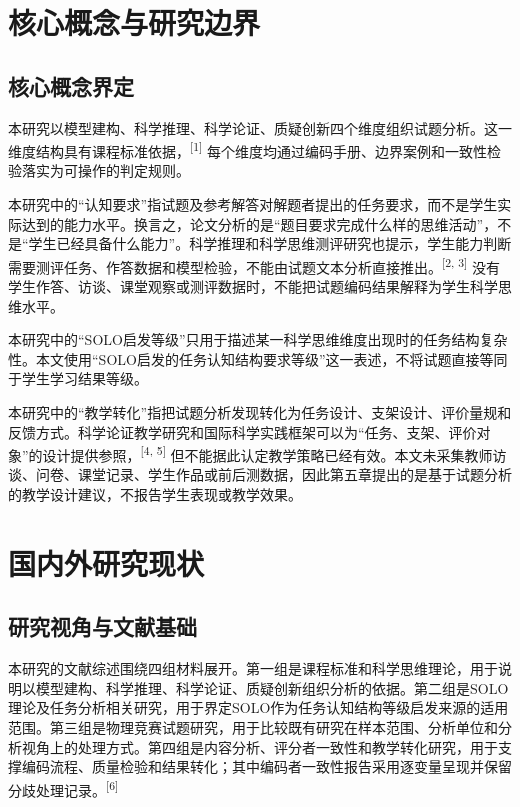 \documentclass[
  12pt,
  a4paper]{ctexbook}
\begin{document}
\section{核心概念与研究边界}\label{ux6838ux5fc3ux6982ux5ff5ux4e0eux7814ux7a76ux8fb9ux754c}

\subsection{核心概念界定}\label{ux6838ux5fc3ux6982ux5ff5ux754cux5b9a}

本研究以模型建构、科学推理、科学论证、质疑创新四个维度组织试题分析。这一维度结构具有课程标准依据，\textsuperscript{[1]}
每个维度均通过编码手册、边界案例和一致性检验落实为可操作的判定规则。

本研究中的``认知要求''指试题及参考解答对解题者提出的任务要求，而不是学生实际达到的能力水平。换言之，论文分析的是``题目要求完成什么样的思维活动''，不是``学生已经具备什么能力''。科学推理和科学思维测评研究也提示，学生能力判断需要测评任务、作答数据和模型检验，不能由试题文本分析直接推出。\textsuperscript{[2, 3]}
没有学生作答、访谈、课堂观察或测评数据时，不能把试题编码结果解释为学生科学思维水平。

本研究中的``SOLO启发等级''只用于描述某一科学思维维度出现时的任务结构复杂性。本文使用``SOLO启发的任务认知结构要求等级''这一表述，不将试题直接等同于学生学习结果等级。

本研究中的``教学转化''指把试题分析发现转化为任务设计、支架设计、评价量规和反馈方式。科学论证教学研究和国际科学实践框架可以为``任务、支架、评价对象''的设计提供参照，\textsuperscript{[4, 5]}
但不能据此认定教学策略已经有效。本文未采集教师访谈、问卷、课堂记录、学生作品或前后测数据，因此第五章提出的是基于试题分析的教学设计建议，不报告学生表现或教学效果。

\section{国内外研究现状}\label{ux56fdux5185ux5916ux7814ux7a76ux73b0ux72b6}

\subsection{研究视角与文献基础}\label{ux7814ux7a76ux89c6ux89d2ux4e0eux6587ux732eux57faux7840}

本研究的文献综述围绕四组材料展开。第一组是课程标准和科学思维理论，用于说明以模型建构、科学推理、科学论证、质疑创新组织分析的依据。第二组是SOLO理论及任务分析相关研究，用于界定SOLO作为任务认知结构等级启发来源的适用范围。第三组是物理竞赛试题研究，用于比较既有研究在样本范围、分析单位和分析视角上的处理方式。第四组是内容分析、评分者一致性和教学转化研究，用于支撑编码流程、质量检验和结果转化；其中编码者一致性报告采用逐变量呈现并保留分歧处理记录。\textsuperscript{[6]}
\end{document}
